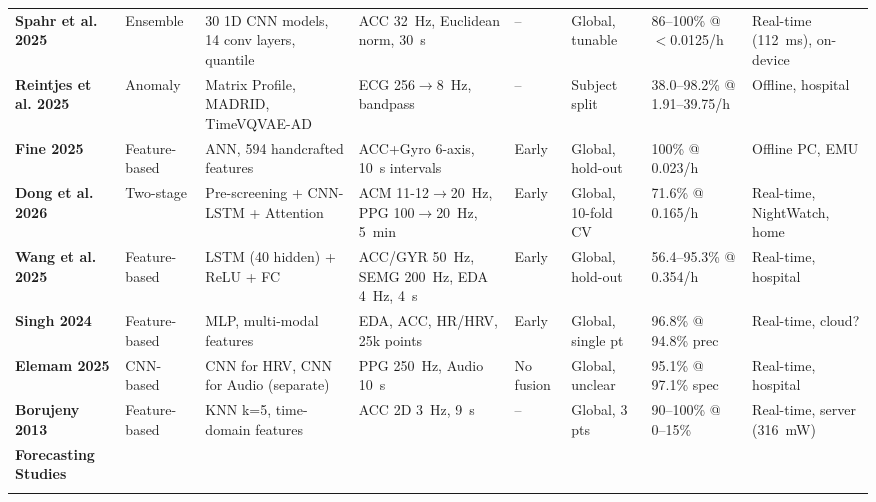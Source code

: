 \begin{landscape}
\begin{table}[htbp]
{\begin{tabular}{@{} l >{\raggedright}p{1.8cm} >{\raggedright}p{2.2cm} >{\raggedright}p{2.0cm} >{\centering}p{1.2cm} >{\raggedright}p{1.8cm} >{\raggedright}p{2.0cm} >{\raggedright}p{1.8cm} @{}}
\textbf{Spahr et al. 2025} & Ensemble & 30 1D CNN models, 14 conv layers, quantile & ACC 32~Hz, Euclidean norm, 30~s & -- & Global, tunable & 86--100\% @ $<$0.0125/h & Real-time (112~ms), on-device \\
\textbf{Reintjes et al. 2025} & Anomaly & Matrix Profile, MADRID, TimeVQVAE-AD & ECG 256$\to$8~Hz, bandpass & -- & Subject split & 38.0--98.2\% @ 1.91--39.75/h & Offline, hospital \\
\textbf{Fine 2025} & Feature-based & ANN, 594 handcrafted features & ACC+Gyro 6-axis, 10~s intervals & Early & Global, hold-out & 100\% @ 0.023/h & Offline PC, EMU \\
\textbf{Dong et al. 2026} & Two-stage & Pre-screening + CNN-LSTM + Attention & ACM 11-12$\to$20~Hz, PPG 100$\to$20~Hz, 5~min & Early & Global, 10-fold CV & 71.6\% @ 0.165/h & Real-time, NightWatch, home \\
\textbf{Wang et al. 2025} & Feature-based & LSTM (40 hidden) + ReLU + FC & ACC/GYR 50~Hz, SEMG 200~Hz, EDA 4~Hz, 4~s & Early & Global, hold-out & 56.4--95.3\% @ 0.354/h & Real-time, hospital \\
\textbf{Singh 2024} & Feature-based & MLP, multi-modal features & EDA, ACC, HR/HRV, 25k points & Early & Global, single pt & 96.8\% @ 94.8\% prec & Real-time, cloud? \\
\textbf{Elemam 2025} & CNN-based & CNN for HRV, CNN for Audio (separate) & PPG 250~Hz, Audio 10~s & No fusion & Global, unclear & 95.1\% @ 97.1\% spec & Real-time, hospital \\
\textbf{Borujeny 2013} & Feature-based & KNN k=5, time-domain features & ACC 2D 3~Hz, 9~s & -- & Global, 3 pts & 90--100\% @ 0--15\% & Real-time, server (316~mW) \\
\addlinespace

\textbf{Forecasting Studies} \\
\addlinespace


\end{tabular}}
\end{table}
\end{landscape}
